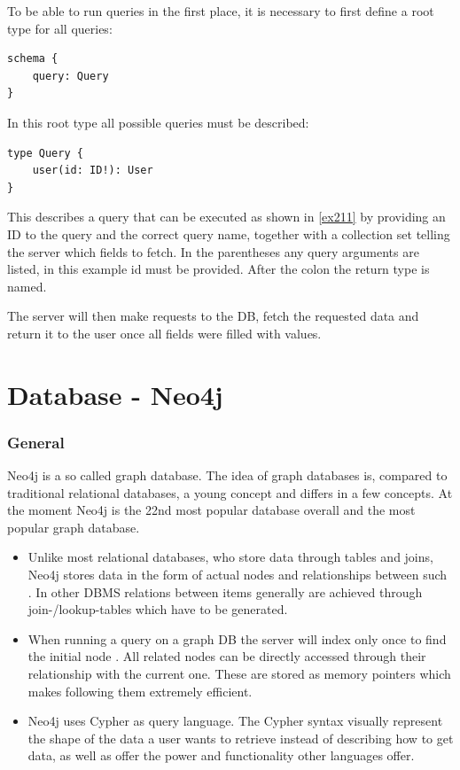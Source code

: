 To be able to run queries in the first place, it is necessary to first define a root type for all queries:

\begin{lstlisting}[caption={Root Type Definition}]
schema {
	query: Query
}
\end{lstlisting}

In this root type all possible queries must be described:

\begin{lstlisting}[caption={Defining Queries}]
type Query { 
	user(id: ID!): User 
}
\end{lstlisting}

This describes a query that can be executed as shown in \autoref{ex211} by providing an ID to the query and the correct query name, together with a collection set telling the server which fields to fetch. In the parentheses any query arguments are listed, in this example id must be provided. After the colon the return type is named. 

The server will then make requests to the DB, fetch the requested data and return it to the user once all fields were filled with values.


\section{Database - Neo4j}
\subsubsection{General}
Neo4j is a so called graph database. The idea of graph databases is, compared to traditional relational databases, a young concept and differs in a few concepts. At the moment Neo4j is the 22nd most popular database overall \cite{DbEnginesGeneral} and the most popular graph database. \cite{DbEnginesGraph}

\begin{itemize}
\item Unlike most relational databases, who store data through tables and joins, Neo4j stores data in the form of actual nodes and relationships between such \cite{Neo4jDevGuides}. In other DBMS relations between items generally are achieved through join-/lookup-tables which have to be generated. \cite{RelVsGraph}

\item When running a query on a graph DB the server will index only once to find the initial node \citep[minute 32]{NeoInternals}. All related nodes can be directly accessed through their relationship with the current one. \cite{WhatGraphDB} These are stored as memory pointers which makes following them extremely efficient.

\item Neo4j uses Cypher as query language. The Cypher syntax visually represent the shape of the data a user wants to retrieve instead of describing how to get data, as well as offer the power and functionality other languages offer. \cite{Neo4jCypher} 
\end{itemize}

